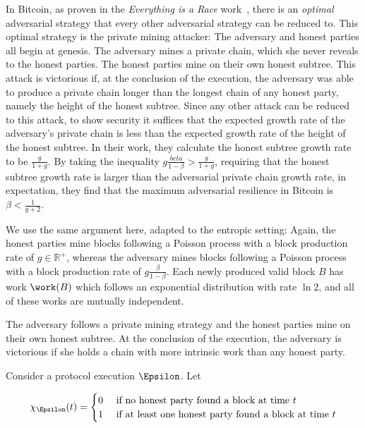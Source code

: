 In Bitcoin,
as proven in the \emph{Everything is a Race} work~\cite[Theorem 5.1]{eiar}, there is
an \emph{optimal} adversarial strategy that every other adversarial strategy can be reduced to.
This optimal strategy is the private mining attacker: The adversary and honest parties
all begin at genesis. The adversary mines a private chain, which she never reveals to the honest
parties. The honest parties mine on their own honest subtree. This attack is victorious if,
at the conclusion of the execution, the adversary was able to produce a private chain longer
than the longest chain of any honest party, namely the height of the honest subtree. Since
any other attack can be reduced to this attack, to show security it suffices that the expected
growth rate of the adversary's private chain is less than the expected growth rate of the
height of the honest subtree. In their work, they calculate the honest subtree growth rate to be
$\frac{g}{1 + g}$. By taking the inequality $g \frac{beta}{1 - \beta} > \frac{g}{1 + g}$,
requiring that the honest subtree growth rate is larger than the adversarial private chain
growth rate, in expectation, they find that the maximum adversarial resilience in Bitcoin is
$\beta < \frac{1}{g + 2}$.

We use the same argument here, adapted to the entropic setting: Again, the honest parties mine
blocks following a Poisson process with a block production rate of $g \in \mathbb{R}^+$, whereas
the adversary mines blocks following a Poisson process with a block production rate of
$g \frac{\beta}{1 - \beta}$. Each newly produced valid block $B$ has work $\work(B)$ which follows
an exponential distribution with rate $\ln2$, and all of these works are mutually independent.


The adversary follows a private
mining strategy and the honest parties mine on their own honest subtree. At the conclusion of the
execution, the adversary is victorious if she holds a chain with more intrinsic work than any honest
party.

Consider a protocol execution $\Epsilon$. Let

\[
  \chi_\Epsilon(t) = \begin{cases}
    0 & \text{ if no honest party found a block at time } t\\
    1 & \text{ if at least one honest party found a block at time } t
  \end{cases}
\]


